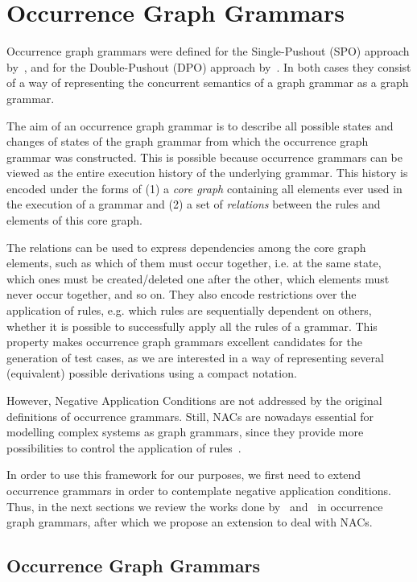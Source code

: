 \chapter{Occurrence Graph Grammars}\label{ch:process}

Occurrence graph grammars were defined for the Single-Pushout (SPO) approach by~\cite{Ribeiro1996}, and for the Double-Pushout (DPO) approach by~\cite{Corradini1996}. In both cases they consist of a way of representing the concurrent semantics of a graph grammar as a graph grammar. 

The aim of an occurrence graph grammar is to describe all possible states and changes of states of the graph grammar from which the occurrence graph grammar was constructed. This is possible because occurrence grammars can be viewed as the entire execution history of the underlying grammar. This history is encoded under the forms of (1) a \emph{core graph} containing all elements ever used in the execution of a grammar and (2) a set of \emph{relations} between the rules and elements of this core graph. 

The relations can be used to express dependencies among the core graph elements, such as which of them must occur together, i.e. at the same state, which ones must be created/deleted one after the other, which elements must never occur together, and so on. They also encode restrictions over the application of rules, e.g. which rules are sequentially dependent on others, whether it is possible to successfully apply all the rules of a grammar. This property makes occurrence graph grammars excellent
candidates for the generation of test cases, as we are interested in a way of representing several (equivalent) possible derivations using a compact notation.

However, Negative Application Conditions are not addressed by the original definitions of occurrence grammars. Still, NACs are nowadays essential for modelling complex systems as graph grammars, since they provide more possibilities to control the application of rules~\cite{Habel1996, Lambers2008, Corradini2014}.

In order to use this framework for our purposes, we first need to extend occurrence grammars in order to contemplate negative application conditions. Thus, in the next sections we review the works done by~\cite{Ribeiro1996} and~\cite{Corradini1996} in occurrence graph grammars, after which we propose an extension to deal with NACs.

\section{Occurrence Graph Grammars}

